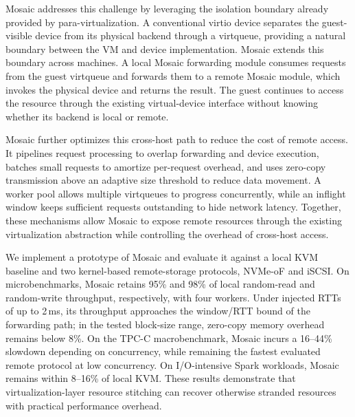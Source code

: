 \documentclass[sigplan,10pt]{acmart}
\begin{document}
Mosaic addresses this challenge by leveraging the isolation boundary already provided by para-virtualization. A conventional virtio device separates the guest-visible device from its physical backend through a virtqueue, providing a natural boundary between the VM and device implementation. Mosaic extends this boundary across machines. A local Mosaic forwarding module consumes requests from the guest virtqueue and forwards them to a remote Mosaic module, which invokes the physical device and returns the result. The guest continues to access the resource through the existing virtual-device interface without knowing whether its backend is local or remote.

Mosaic further optimizes this cross-host path to reduce the cost of remote access. It pipelines request processing to overlap forwarding and device execution, batches small requests to amortize per-request overhead, and uses zero-copy transmission above an adaptive size threshold to reduce data movement. A worker pool allows multiple virtqueues to progress concurrently, while an inflight window keeps sufficient requests outstanding to hide network latency. Together, these mechanisms allow Mosaic to expose remote resources through the existing virtualization abstraction while controlling the overhead of cross-host access.

We implement a prototype of Mosaic and evaluate it against a local KVM baseline and two kernel-based remote-storage protocols, NVMe-oF and iSCSI. On microbenchmarks, Mosaic retains 95\% and 98\% of local random-read and random-write throughput, respectively, with four workers. Under injected RTTs of up to 2\,ms, its throughput approaches the window/RTT bound of the forwarding path; in the tested block-size range, zero-copy memory overhead remains below 8\%. On the TPC-C macrobenchmark, Mosaic incurs a 16--44\% slowdown depending on concurrency, while remaining the fastest evaluated remote protocol at low concurrency. On I/O-intensive Spark workloads, Mosaic remains within 8--16\% of local KVM. These results demonstrate that virtualization-layer resource stitching can recover otherwise stranded resources with practical performance overhead.
\end{document}
